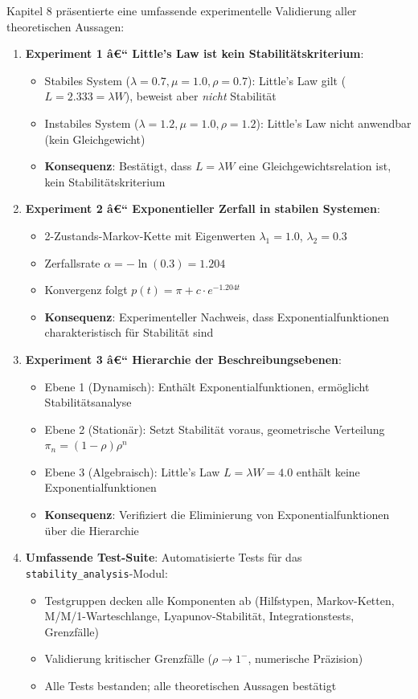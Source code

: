 ﻿\documentclass[a4paper,12pt]{scrreprt}
\theoremstyle{definition}
\begin{document}
Kapitel 8 präsentierte eine umfassende experimentelle Validierung aller theoretischen Aussagen:

\begin{enumerate}
	\item[-] \textbf{Experiment 1 â€“ Little's Law ist kein Stabilitätskriterium}:
	\begin{itemize}
		\item[-] Stabiles System ($\lambda = 0.7, \mu = 1.0, \rho = 0.7$): Little's Law gilt ($L = 2.333 = \lambda W$), beweist aber \textit{nicht} Stabilität
		\item[-] Instabiles System ($\lambda = 1.2, \mu = 1.0, \rho = 1.2$): Little's Law nicht anwendbar (kein Gleichgewicht)
		\item[-] \textbf{Konsequenz}: Bestätigt, dass $L = \lambda W$ eine Gleichgewichtsrelation ist, kein Stabilitätskriterium
	\end{itemize}
	
	\item[-] \textbf{Experiment 2 â€“ Exponentieller Zerfall in stabilen Systemen}:
	\begin{itemize}
		\item[-] 2-Zustands-Markov-Kette mit Eigenwerten $\lambda_1 = 1.0$, $\lambda_2 = 0.3$
		\item[-] Zerfallsrate $\alpha = -\ln(0.3) = 1.204$
		\item[-] Konvergenz folgt $p(t) = \pi + c \cdot e^{-1.204t}$
		\item[-] \textbf{Konsequenz}: Experimenteller Nachweis, dass Exponentialfunktionen charakteristisch für Stabilität sind
	\end{itemize}
	
	\item[-] \textbf{Experiment 3 â€“ Hierarchie der Beschreibungsebenen}:
	\begin{itemize}
		\item[-] Ebene 1 (Dynamisch): Enthält Exponentialfunktionen, ermöglicht Stabilitätsanalyse
		\item[-] Ebene 2 (Stationär): Setzt Stabilität voraus, geometrische Verteilung $\pi_n = (1-\rho)\rho^n$
		\item[-] Ebene 3 (Algebraisch): Little's Law $L = \lambda W = 4.0$ enthält keine Exponentialfunktionen
		\item[-] \textbf{Konsequenz}: Verifiziert die Eliminierung von Exponentialfunktionen über die Hierarchie
	\end{itemize}
	
	\item[-] \textbf{Umfassende Test-Suite}: Automatisierte Tests für das
	\texttt{stability\_analysis}-Modul:
	\begin{itemize}
		\item[-] Testgruppen decken alle Komponenten ab (Hilfstypen,
		Markov-Ketten, M/M/1-Warteschlange, Lyapunov-Stabilität,
		Integrationstests, Grenzfälle)
		\item[-] Validierung kritischer Grenzfälle ($\rho \to 1^-$,
		numerische Präzision)
		\item[-] Alle Tests bestanden; alle theoretischen Aussagen bestätigt
	\end{itemize}
\end{enumerate}
\end{document}
